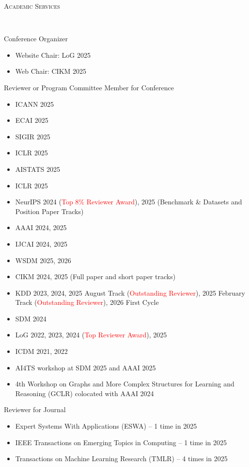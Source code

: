 \documentclass[10pt]{article}
\newenvironment{changemargin}[2]{
  \begin{list}{}{
    \setlength{\topsep}{0pt}
    \setlength{\leftmargin}{#1}
    \setlength{\rightmargin}{#2}
    \setlength{\listparindent}{\parindent}
    \setlength{\itemindent}{\parindent}
    \setlength{\parsep}{\parskip}
  }
  \item[]}{\end{list}
}
\newcommand{\lineover}{
	\begin{changemargin}{-0.05in}{-0.05in}
		\vspace*{-8pt}
		\hrulefill \\
		\vspace*{-2pt}
	\end{changemargin}
}
\newcommand{\header}[1]{
	\begin{changemargin}{-0.5in}{-0.5in}
		\scshape{#1}\\
  	\lineover
	\end{changemargin}
}
\newcommand{\RED}[1]{\textcolor{red}{#1}}
\newenvironment{body} {
	\vspace*{-16pt}
	\begin{changemargin}{-0.25in}{-0.5in}
  }
	{\end{changemargin}
}
\begin{document}
\medskip

\header{Academic Services}

\begin{body}
	\vspace{14pt}
    Conference Organizer
    \begin{itemize}
        \item Website Chair: LoG 2025
        \item Web Chair: CIKM 2025
    \end{itemize}
   Reviewer or Program Committee Member for Conference
    \begin{itemize}
        \item ICANN 2025
        \item ECAI 2025
        \item SIGIR 2025
        \item ICLR 2025
        \item AISTATS 2025
        \item ICLR 2025
        \item NeurIPS 2024 (\RED{Top 8\% Reviewer Award}), 2025 (Benchmark \& Datasets and Position Paper Tracks)
        \item AAAI 2024, 2025
        \item IJCAI 2024, 2025
        \item WSDM 2025, 2026
        \item CIKM 2024, 2025 (Full paper and short paper tracks)
        \item KDD 2023, 2024, 2025 August Track (\RED{Outstanding Reviewer}), 2025 February Track (\RED{Outstanding Reviewer}), 2026 First Cycle
        \item SDM 2024
        \item LoG 2022, 2023, 2024 (\RED{Top Reviewer Award}), 2025
        \item ICDM 2021, 2022
        \item AI4TS workshop at SDM 2025 and AAAI 2025
        \item 4th Workshop on Graphs and More Complex Structures for Learning and Reasoning (GCLR) colocated with AAAI 2024
    \end{itemize}
    Reviewer for Journal
    \begin{itemize}
        \item Expert Systems With Applications (ESWA) – 1 time in 2025
        \item IEEE Transactions on Emerging Topics in Computing – 1 time in 2025
        \item Transactions on Machine Learning Research (TMLR) – 4 times in 2025

\end{itemize}
\end{body}
\end{document}
